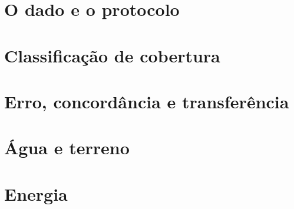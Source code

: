 \documentclass[11pt,a4paper,oneside]{book}
\begin{document}


\mainmatter

\part{O dado e o protocolo}




%
\part{Classificação de cobertura}


%
\part{Erro, concordância e transferência}






%
\part{Água e terreno}



%
\part{Energia}

% 

% 
%
% 
% 
% 
\end{document}
